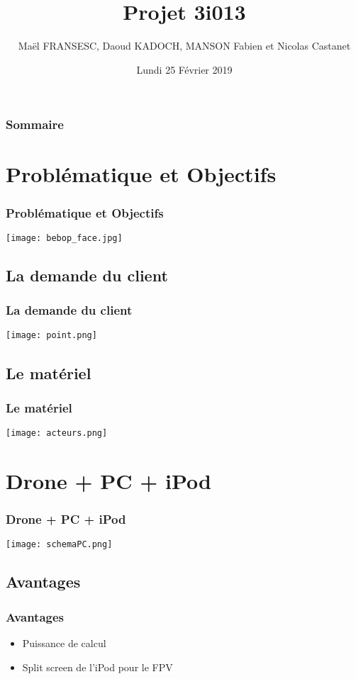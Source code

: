 \documentclass[11pt]{beamer}
\author{Maël FRANSESC, Daoud KADOCH, MANSON Fabien et Nicolas Castanet}
\title{Projet 3i013}
\institute{Sorbonne Université}
\date{Lundi 25 Février 2019}
\begin{document}
\begin{frame}
\titlepage
\end{frame}

\begin{frame}
\frametitle{Sommaire}
\tableofcontents[sections={1-8}]
\end{frame}

\section{Problématique et Objectifs}
\begin{frame}
\frametitle{Problématique et Objectifs}
\begin{center}
\texttt{[image: bebop\_face.jpg]}
\end{center}
\end{frame}

\subsection{La demande du client}
\begin{frame}
\frametitle{La demande du client}
\begin{center}
\texttt{[image: point.png]}
\end{center}

\end{frame}

\subsection{Le matériel}
\begin{frame}
\frametitle{Le matériel}
\begin{center}
\texttt{[image: acteurs.png]}
\end{center}
\end{frame}

\section{Drone + PC + iPod}
\begin{frame}
\frametitle{Drone + PC + iPod}
\texttt{[image: schemaPC.png]}
\end{frame}

\subsection{Avantages}
\begin{frame}
\frametitle{Avantages}

\begin{itemize}
\item Puissance de calcul 
    
\item Split screen de l'iPod pour le FPV 
\end{itemize}
\end{frame}
\end{document}
